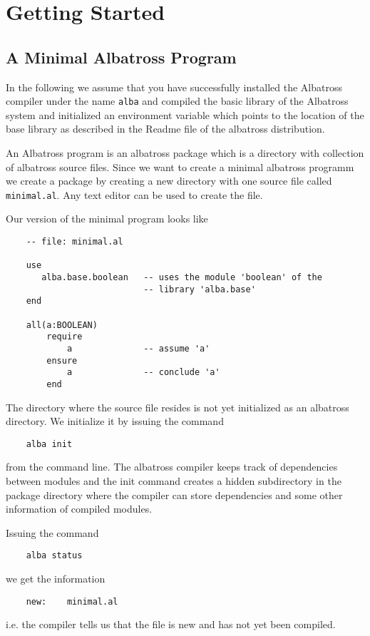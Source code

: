 \section{Getting Started}

\subsection{A Minimal Albatross Program}

In the following we assume that you have successfully installed the Albatross
compiler under the name \lstinline!alba! and compiled the basic library of the
Albatross system and initialized an environment variable which points to the
location of the base library as described in the Readme file of the albatross
distribution.


An Albatross program is an albatross package which is a directory with
collection of albatross source files. Since we want to create a minimal
albatross programm we create a package by creating a new directory with one
source file called \lstinline!minimal.al!. Any text editor can be used to create the
file.

Our version of the minimal program looks like

\begin{lstlisting}
    -- file: minimal.al

    use
       alba.base.boolean   -- uses the module 'boolean' of the
                           -- library 'alba.base'
    end

    all(a:BOOLEAN)
        require
            a              -- assume 'a'
        ensure
            a              -- conclude 'a'
        end
\end{lstlisting}

The directory where the source file resides is not yet initialized as an
albatross directory. We initialize it by issuing the command
\begin{lstlisting}
    alba init
\end{lstlisting}
from the command line. The albatross compiler keeps track of dependencies
between modules and the init command creates a hidden subdirectory in the
package directory where the compiler can store dependencies and some other
information of compiled modules.

Issuing the command
\begin{lstlisting}
    alba status
\end{lstlisting}
we get the information
\begin{lstlisting}
    new:    minimal.al
\end{lstlisting}
i.e. the compiler tells us that the file is new and has not yet been compiled.

